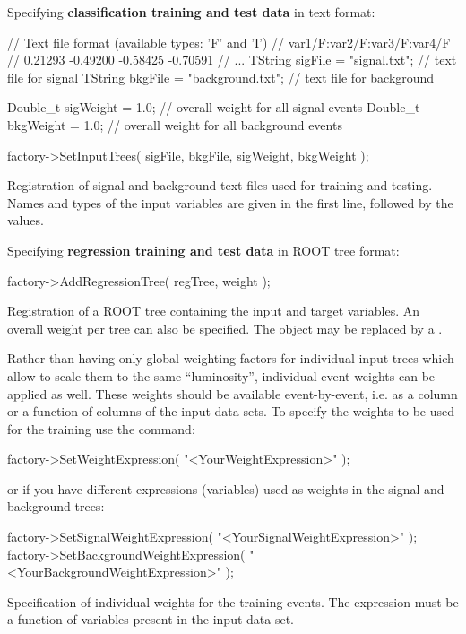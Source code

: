 Specifying {\bf classification training and test data} in text format:
\begin{codeexample}
\begin{tmvacode}
// Text file format (available types: 'F' and 'I')
//   var1/F:var2/F:var3/F:var4/F
//   0.21293  -0.49200  -0.58425  -0.70591
//   ...
TString sigFile = "signal.txt";     // text file for signal
TString bkgFile = "background.txt"; // text file for background

Double_t sigWeight = 1.0; // overall weight for all signal events
Double_t bkgWeight = 1.0; // overall weight for all background events

factory->SetInputTrees( sigFile, bkgFile, sigWeight, bkgWeight );
\end{tmvacode}
\caption[.]{\codeexampleCaptionSize Registration of signal and background text files used for training and testing. 
            Names and types of the input variables are given in the first line, 
            followed by the values.}
\end{codeexample}
\clearpage
Specifying {\bf regression training and test data} in ROOT tree format:
\begin{codeexample}
\begin{tmvacode}
factory->AddRegressionTree( regTree, weight );  
\end{tmvacode}
\caption[.]{\codeexampleCaptionSize Registration of a ROOT tree containing the 
            input and target variables. An overall weight per tree can also be specified.
            The  object may be replaced by a .
}
\end{codeexample}

Rather than having only global weighting factors for individual input
trees which allow to scale them to the same ``luminosity'', individual
event weights can be applied as well. These weights should be
available event-by-event, i.e. as a column or a function of columns of
the input data sets. To specify the weights to be used for the
training use the command:
\begin{codeexample}
\begin{tmvacode}
factory->SetWeightExpression( "<YourWeightExpression>" );
\end{tmvacode}

or if you have different expressions (variables) used as weights in the signal and background
trees:

\begin{tmvacode}
factory->SetSignalWeightExpression( "<YourSignalWeightExpression>" );
factory->SetBackgroundWeightExpression( "<YourBackgroundWeightExpression>" );
\end{tmvacode}
\caption[.]{\codeexampleCaptionSize Specification of individual weights for the 
            training events. The expression must be a function of variables present in 
            the input data set.}
\end{codeexample}

